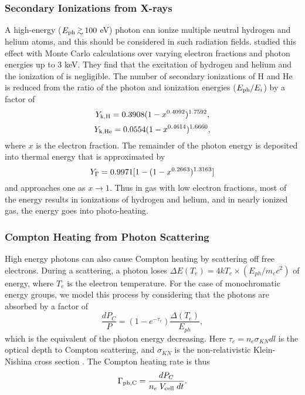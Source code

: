 \documentclass[12pt,preprint]{aastex}
\begin{document}
\subsubsection{Secondary Ionizations from X-rays}
\label{sec:xrays}

A high-energy ($E_{\rm ph} \gsim 100$ eV) photon can ionize multiple
neutral hydrogen and helium atoms, and this should be considered in
such radiation fields.  \citet{Shull85} studied this effect with Monte
Carlo calculations over varying electron fractions and photon energies
up to 3 keV.  They find that the excitation of hydrogen and helium and
the ionization of  is negligible.  The number of secondary
ionizations of H and He is reduced from the ratio of the photon and
ionization energies ($E_{\rm ph} / E_i$) by a factor of
%
\begin{equation}
  Y_{\rm k,H} = 0.3908 (1 - x^{0.4092})^{1.7592},
\end{equation}
\begin{equation}
  Y_{\rm k,He} = 0.0554 (1 - x^{0.4614})^{1.6660},
\end{equation}
where $x$ is the electron fraction.  The remainder of the photon
energy is deposited into thermal energy that is approximated by
%
\begin{equation}
  Y_{\rm \Gamma} = 0.9971 [ 1 - (1 - x^{0.2663})^{1.3163} ]
\end{equation}
and approaches one as $x \rightarrow 1$.  Thus in gas with low
electron fractions, most of the energy results in ionizations of
hydrogen and helium, and in nearly ionized gas, the energy goes into
photo-heating.

\subsubsection{Compton Heating from Photon Scattering}

High energy photons can also cause Compton heating by scattering off
free electrons.  During a scattering, a photon loses $\Delta E(T_e) =
4kT_e \times (E_{ph} / m_e c^2)$ of energy, where $T_e$ is the
electron temperature.  For the case of monochromatic energy groups, we
model this process by considering that the photons are absorbed by a
factor of 
\begin{equation}
  \frac{dP_C}{P} = (1 - e^{-\tau_e}) \frac{\Delta(T_e)}{E_{ph}},
\end{equation}
which is the equivalent of the photon energy decreasing.  Here $\tau_e
= n_e \sigma_{KN} dl$ is the optical depth to Compton scattering, and
$\sigma_{KN}$ is the non-relativistic Klein-Nishina cross section
\citep{Rybicki}.  The Compton heating rate is thus
\begin{equation}
  \Gamma_{\rm ph,C} = \frac{dP_C}{n_e \; V_{\rm cell} \; dt}.
\end{equation}
\end{document}
